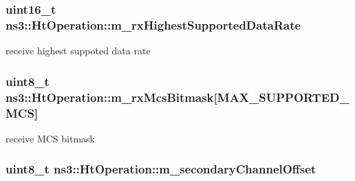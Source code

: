 \subsubsection[{\texorpdfstring{m\+\_\+rx\+Highest\+Supported\+Data\+Rate}{m_rxHighestSupportedDataRate}}]{\setlength{\rightskip}{0pt plus 5cm}uint16\+\_\+t ns3\+::\+Ht\+Operation\+::m\+\_\+rx\+Highest\+Supported\+Data\+Rate\hspace{0.3cm}{\ttfamily [private]}}\hypertarget{classns3_1_1HtOperation_a56002f4602644ee677be9d36ca5f78ec}{}\label{classns3_1_1HtOperation_a56002f4602644ee677be9d36ca5f78ec}


receive highest suppoted data rate 

\subsubsection[{\texorpdfstring{m\+\_\+rx\+Mcs\+Bitmask}{m_rxMcsBitmask}}]{\setlength{\rightskip}{0pt plus 5cm}uint8\+\_\+t ns3\+::\+Ht\+Operation\+::m\+\_\+rx\+Mcs\+Bitmask\mbox{[}{\bf M\+A\+X\+\_\+\+S\+U\+P\+P\+O\+R\+T\+E\+D\+\_\+\+M\+CS}\mbox{]}\hspace{0.3cm}{\ttfamily [private]}}\hypertarget{classns3_1_1HtOperation_a50f8a0dc63f0fd3076ad1828735c0e7e}{}\label{classns3_1_1HtOperation_a50f8a0dc63f0fd3076ad1828735c0e7e}


receive M\+CS bitmask 

\subsubsection[{\texorpdfstring{m\+\_\+secondary\+Channel\+Offset}{m_secondaryChannelOffset}}]{\setlength{\rightskip}{0pt plus 5cm}uint8\+\_\+t ns3\+::\+Ht\+Operation\+::m\+\_\+secondary\+Channel\+Offset\hspace{0.3cm}{\ttfamily [private]}}\hypertarget{classns3_1_1HtOperation_a4ad5d94805d6910d6701d47ed4a521c7}{}\label{classns3_1_1HtOperation_a4ad5d94805d6910d6701d47ed4a521c7}


